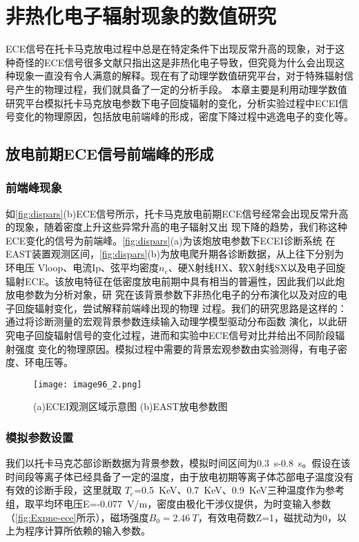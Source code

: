\chapter{非热化电子辐射现象的数值研究}
ECE信号在托卡马克放电过程中总是在特定条件下出现反常升高的现象，对于这种奇怪的ECE信号很多文献只指出这是非热化电子导致，但究竟为什么会出现这种现象一直没有令人满意的解释。现在有了动理学数值研究平台，对于特殊辐射信号产生的物理过程，我们就具备了一定的分析手段。
本章主要是利用动理学数值研究平台模拟托卡马克放电参数下电子回旋辐射的变化，分析实验过程中ECEI信号变化的物理原因，包括放电前端峰的形成，密度下降过程中逃逸电子的变化等。                                                                                                                                                                                  
\section{放电前期ECE信号前端峰的形成 }\label{sec:startup}
\subsection{前端峰现象}
如\autoref{fig:dispars}(b)ECE信号所示，托卡马克放电前期ECE信号经常会出现反常升高的现象，随着密度上升这些异常升高的电子辐射又出
现下降的趋势，我们称这种ECE变化的信号为前端峰。\autoref{fig:dispars}(a)为该炮放电参数下ECEI诊断系统
在EAST装置观测区间，\autoref{fig:dispars}(b)为放电爬升期各诊断数据，从上往下分别为环电压
Vloop、电流Ip、弦平均密度$n_e$、硬X射线HX、软X射线SX以及电子回旋辐射ECE。该放电特征在低密度放电前期中具有相当的普遍性，因此我们以此炮放电参数为分析对象，研
究在该背景参数下非热化电子的分布演化以及对应的电子回旋辐射变化，尝试解释前端峰出现的物理
过程。我们的研究思路是这样的：通过将诊断测量的宏观背景参数连续输入动理学模型驱动分布函数
演化，以此研究电子回旋辐射信号的变化过程，进而和实验中ECE信号对比并给出不同阶段辐射强度
变化的物理原因。模拟过程中需要的背景宏观参数由实验测得，有电子密度、环电压等。
\begin{figure}
\centering
\texttt{[image: image96\_2.png]}
\caption{\label{fig:dispars}(a)ECEI观测区域示意图 (b)EAST放电参数图}
\end{figure}
\subsection{模拟参数设置}
我们以托卡马克芯部诊断数据为背景参数，模拟时间区间为0.3~s-0.8~s。假设在该时间段等离子体已经具备了一定的温度，由于放电初期等离子体芯部电子温度没有有效的诊断手段，这里就取 $T_e$=0.5~KeV、0.7~KeV、0.9~KeV三种温度作为参考组，取平均环电压E=-0.077~V/m，密度由极化干涉仪提供，为时变输入参数（\autoref{fig:Expne-ece}所示），磁场强度$B_0=2.46~T$，有效电荷数Z=1，磁扰动为0，以上为程序计算所依赖的输入参数。

